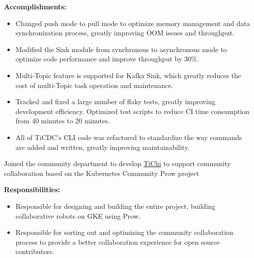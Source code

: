 \documentclass{resume}
\newcommand{\en}[1]{#1}
\newcommand{\zh}[1]{}
\begin{document}
\en{\textbf{Accomplishments:}}
\zh{\textbf{产出：}}
\begin{itemize}
      \item \en{Changed push mode to pull mode to optimize memory management and data synchronization process, greatly improving OOM issues and throughput.}
            \zh{将推送模式修改为了拉取模式优化了内存管理和数据同步流程，极大的改善了 OOM 问题和吞吐。}
      \item \en{Modified the Sink module from synchronous to asynchronous mode to optimize code performance and improve throughput by 30\%.}
            \zh{将 Sink 模块从同步模式修改为异步模式，优化代码性能，将吞吐提升 30\%。}
      \item \en{Multi-Topic feature is supported for Kafka Sink, which greatly reduces the cost of multi-Topic task operation and maintenance.}
            \zh{为 Kafka Sink 支持了多 Topic 功能，极大的降低了多 Topic 的任务运维成本。}
      \item \en{Tracked and fixed a large number of flaky tests, greatly improving development efficiency. Optimized test scripts to reduce CI time consumption from 40 minutes to 20 minutes.}
            \zh{追踪和修复大量不稳定测试，极大的提升了开发效率。优化了测试脚本，将 CI 时间消耗从 40 分钟降低至 20 分钟。}
      \item \en{All of TiCDC's CLI code was refactored to standardize the way commands are added and written, greatly improving maintainability.}
            \zh{重构了 TiCDC 的 CLI 所有代码，标准化了命令添加和编写方式，极大提升了可维护性。}
\end{itemize}
\en{}
\zh{\datedsubsection{\textbf{\href{https://pingcap.com/zh/}{北京平凯星辰科技发展有限公司（PingCAP Inc.）- 数据库 - 前后端开发工程师}}}{2020/08 -- 2021/07}}
\en{Joined the community department to develop {\href{https://github.com/ti-community-infra/tichi}{TiChi}} to support community collaboration based on the Kubernetes Community Prow project}
\zh{加入了社区部门，以 Kubernetes 社区 Prow 项目为基础开发{\href{https://github.com/ti-community-infra/tichi}{TiChi}} 来支撑社区协作}

\en{\textbf{Responsibilities:}}
\zh{\textbf{职责：}}
\begin{itemize}
      \item \en{Responsible for designing and building the entire project, building collaborative robots on GKE using Prow.}
            \zh{负责从零开始设计和构建整个项目，使用 Prow 在 GKE 上搭建协作机器人。}
      \item \en{Responsible for sorting out and optimizing the community collaboration process to provide a better collaboration experience for open source contributors.}
            \zh{负责社区协作流程的梳理和优化，为开源贡献者提供更好的协作体验。}
\end{itemize}
\end{document}
